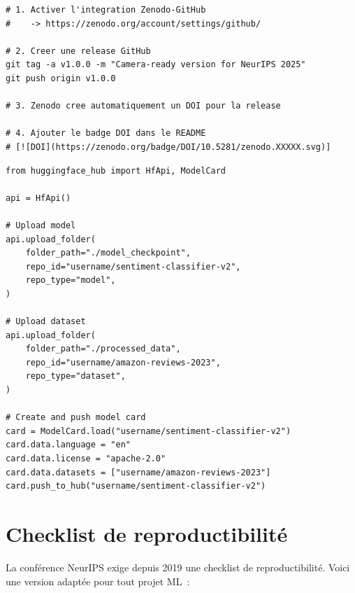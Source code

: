 \begin{codeblock}[title=\textbf{Archivage automatique avec Zenodo + GitHub}]
\begin{verbatim}
# 1. Activer l'integration Zenodo-GitHub
#    -> https://zenodo.org/account/settings/github/

# 2. Creer une release GitHub
git tag -a v1.0.0 -m "Camera-ready version for NeurIPS 2025"
git push origin v1.0.0

# 3. Zenodo cree automatiquement un DOI pour la release

# 4. Ajouter le badge DOI dans le README
# [![DOI](https://zenodo.org/badge/DOI/10.5281/zenodo.XXXXX.svg)]
\end{verbatim}
\end{codeblock}

\begin{codeblock}[title=\textbf{Publication sur Hugging Face Hub}]
\begin{verbatim}
from huggingface_hub import HfApi, ModelCard

api = HfApi()

# Upload model
api.upload_folder(
    folder_path="./model_checkpoint",
    repo_id="username/sentiment-classifier-v2",
    repo_type="model",
)

# Upload dataset
api.upload_folder(
    folder_path="./processed_data",
    repo_id="username/amazon-reviews-2023",
    repo_type="dataset",
)

# Create and push model card
card = ModelCard.load("username/sentiment-classifier-v2")
card.data.language = "en"
card.data.license = "apache-2.0"
card.data.datasets = ["username/amazon-reviews-2023"]
card.push_to_hub("username/sentiment-classifier-v2")
\end{verbatim}
\end{codeblock}

\section{Checklist de reproductibilit\'e}
\label{sec:checklist}

La conf\'erence NeurIPS exige depuis 2019 une checklist de
reproductibilit\'e. Voici une version adapt\'ee pour tout projet ML~:

